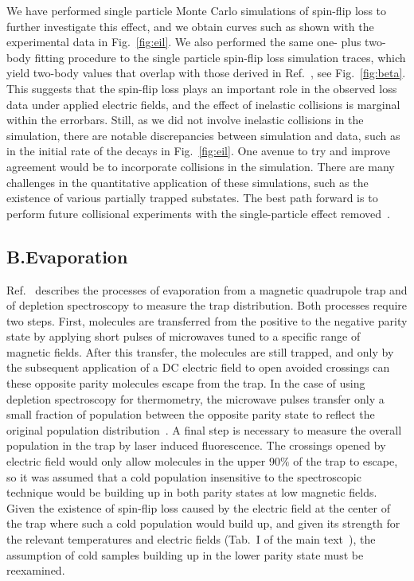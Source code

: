 \documentclass[%
 reprint,
 amsmath,amssymb,
 aps,
prl,
]{revtex4-1}
\begin{document}
We have performed single particle Monte Carlo simulations of spin-flip loss to further investigate this effect, and we obtain curves such as shown with the experimental data in Fig.~\ref{fig:eil}.
We also performed the same one- plus two-body fitting procedure to the single particle spin-flip loss simulation traces, which yield two-body values that overlap with those derived in Ref.~\cite{Stuhl2013}, see Fig.~\ref{fig:beta}.  This suggests that the spin-flip loss plays an important role in the observed loss data under applied electric fields, and the effect of inelastic collisions is marginal within the errorbars. Still, as we did not involve inelastic collisions in the simulation, there are notable discrepancies between simulation and data, such as in the initial rate of the decays in Fig.~\ref{fig:eil}.
One avenue to try and improve agreement would be to incorporate collisions in the simulation. There are many challenges in the quantitative application of these simulations, such as the existence of various partially trapped substates. The best path forward is to perform future collisional experiments with the single-particle effect removed~\cite{smt}.

\subsection{B.\quad Evaporation\label{sec:evap}}

Ref.~\cite{Stuhl2012evap} describes the processes of evaporation from a magnetic quadrupole trap and of depletion spectroscopy to measure the trap distribution. Both processes require two steps.
First, molecules are transferred from the positive to the negative parity state by applying short pulses of microwaves tuned to a specific range of magnetic fields.
After this transfer, the molecules are still trapped, and only by the subsequent application of a DC electric field to open avoided crossings can these opposite parity molecules escape from the trap.
In the case of using depletion spectroscopy for thermometry, the microwave pulses transfer only a small fraction of population between the opposite parity state to reflect the original population distribution~\cite{Stuhl2012uwave}. A final step is necessary to measure the overall population in the trap by laser induced fluorescence.
The crossings opened by electric field would only allow molecules in the upper $90\%$ of the trap to escape, so it was assumed that a cold population insensitive to the spectroscopic technique would be building up in both parity states at low magnetic fields. Given the existence of spin-flip loss caused by the electric field at the center of the trap where such a cold population would build up, and given its strength for the relevant temperatures and electric fields (Tab.~I of the main text~\cite{smt}), the assumption of cold samples building up in the lower parity state must be reexamined.
\end{document}
